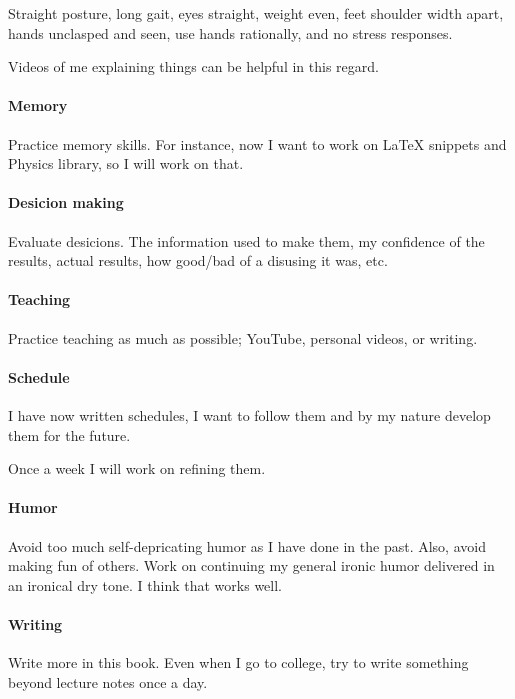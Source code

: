 Straight posture, long gait, eyes straight, weight even, feet shoulder width apart, hands unclasped and seen, use hands rationally, and no stress responses.

Videos of me explaining things can be helpful in this regard.

\paragraph{Memory}

Practice memory skills. For instance, now I want to work on LaTeX snippets and Physics library, so I will work on that.

\paragraph{Desicion making}

Evaluate desicions. The information used to make them, my confidence of the results, actual results, how good/bad of a disusing it was, etc.

\paragraph{Teaching}

Practice teaching as much as possible; YouTube, personal videos, or writing.

\paragraph{Schedule}

I have now written schedules, I want to follow them and by my nature develop them for the future.

Once a week I will work on refining them.
\paragraph{Humor}

Avoid too much self-depricating humor as I have done in the past. Also, avoid making fun of others. Work on continuing my general ironic humor delivered in an ironical dry tone. I think that works well.

\paragraph{Writing}

Write more in this book. Even when I go to college, try to write something beyond lecture notes once a day.

